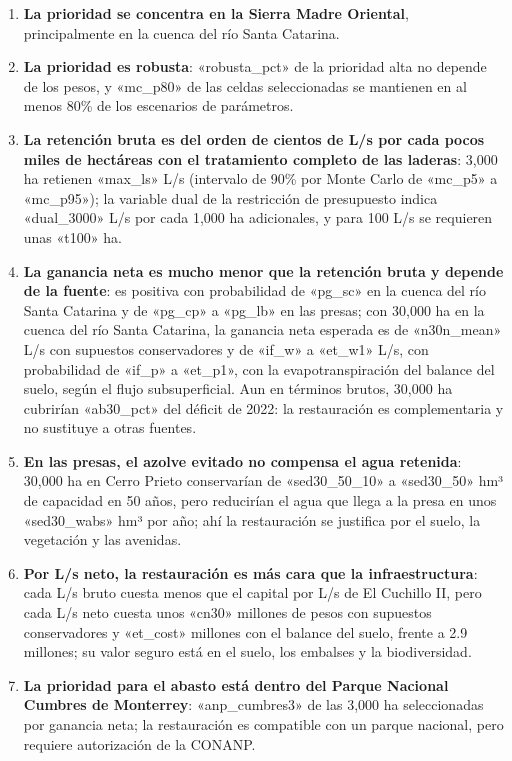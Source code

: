 \begin{enumerate}
  \item \textbf{La prioridad se concentra en la Sierra Madre Oriental}, principalmente en la cuenca del río Santa Catarina.
  \item \textbf{La prioridad es robusta}: «robusta_pct» de la prioridad alta no depende de los pesos, y «mc_p80» de las celdas seleccionadas se mantienen en al menos 80\% de los escenarios de parámetros.
  \item \textbf{La retención bruta es del orden de cientos de L/s por cada pocos miles de hectáreas con el tratamiento completo de las laderas}: 3,000 ha retienen «max_ls» L/s (intervalo de 90\% por Monte Carlo de «mc_p5» a «mc_p95»); la variable dual de la restricción de presupuesto indica «dual_3000» L/s por cada 1,000 ha adicionales, y para 100 L/s se requieren unas «t100» ha.
  \item \textbf{La ganancia neta es mucho menor que la retención bruta y depende de la fuente}: es positiva con probabilidad de «pg_sc» en la cuenca del río Santa Catarina y de «pg_cp» a «pg_lb» en las presas; con 30,000 ha en la cuenca del río Santa Catarina, la ganancia neta esperada es de «n30n_mean» L/s con supuestos conservadores y de «if_w» a «et_w1» L/s, con probabilidad de «if_p» a «et_p1», con la evapotranspiración del balance del suelo, según el flujo subsuperficial. Aun en términos brutos, 30,000 ha cubrirían «ab30_pct» del déficit de 2022: la restauración es complementaria y no sustituye a otras fuentes.
  \item \textbf{En las presas, el azolve evitado no compensa el agua retenida}: 30,000 ha en Cerro Prieto conservarían de «sed30_50_10» a «sed30_50» hm³ de capacidad en 50 años, pero reducirían el agua que llega a la presa en unos «sed30_wabs» hm³ por año; ahí la restauración se justifica por el suelo, la vegetación y las avenidas.
  \item \textbf{Por L/s neto, la restauración es más cara que la infraestructura}: cada L/s bruto cuesta menos que el capital por L/s de El Cuchillo II, pero cada L/s neto cuesta unos «cn30» millones de pesos con supuestos conservadores y «et_cost» millones con el balance del suelo, frente a 2.9 millones; su valor seguro está en el suelo, los embalses y la biodiversidad.
  \item \textbf{La prioridad para el abasto está dentro del Parque Nacional Cumbres de Monterrey}: «anp_cumbres3» de las 3,000 ha seleccionadas por ganancia neta; la restauración es compatible con un parque nacional, pero requiere autorización de la CONANP.

\end{enumerate}
